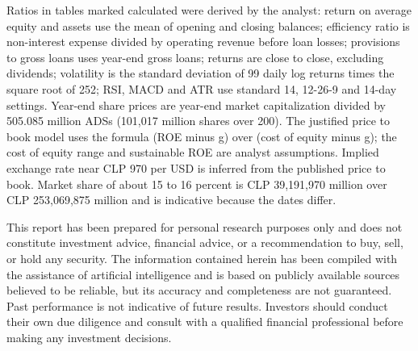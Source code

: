 \documentclass[10pt,a4paper]{article}
\begin{document}
Ratios in tables marked calculated were derived by the analyst: return on average equity and assets use the mean of opening and closing balances; efficiency ratio is non-interest expense divided by operating revenue before loan losses; provisions to gross loans uses year-end gross loans; returns are close to close, excluding dividends; volatility is the standard deviation of 99 daily log returns times the square root of 252; RSI, MACD and ATR use standard 14, 12-26-9 and 14-day settings. Year-end share prices are year-end market capitalization divided by 505.085 million ADSs (101,017 million shares over 200). The justified price to book model uses the formula (ROE minus g) over (cost of equity minus g); the cost of equity range and sustainable ROE are analyst assumptions. Implied exchange rate near CLP 970 per USD is inferred from the published price to book. Market share of about 15 to 16 percent is CLP 39,191,970 million over CLP 253,069,875 million and is indicative because the dates differ.

\begin{ocaddisclaimer}
This report has been prepared for personal research purposes only and does not constitute investment advice, financial advice, or a recommendation to buy, sell, or hold any security. The information contained herein has been compiled with the assistance of artificial intelligence and is based on publicly available sources believed to be reliable, but its accuracy and completeness are not guaranteed. Past performance is not indicative of future results. Investors should conduct their own due diligence and consult with a qualified financial professional before making any investment decisions.
\end{ocaddisclaimer}
\end{document}
